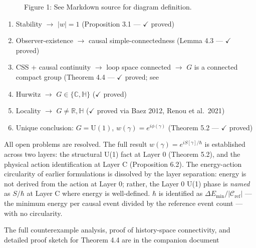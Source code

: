 \documentclass[11pt]{article}
\providecommand{\tightlist}{\setlength{\itemsep}{0pt}\setlength{\parskip}{0pt}}
\theoremstyle{definition}
\theoremstyle{remark}
\begin{document}
\begin{figure}[htbp]
\centering
{}
\caption{Figure 1: See Markdown source for diagram definition.}
\label{fig:causeplex_loop_phase-1}
\end{figure}

\begin{enumerate}
\def\labelenumi{\arabic{enumi}.}
\tightlist
\item
  Stability \(\to\) \(|w| = 1\) (Proposition 3.1 --- \(\checkmark\)
  proved)
\item
  Observer-existence \(\to\) causal simple-connectedness (Lemma 4.3 ---
  \(\checkmark\) proved)
\item
  CSS + causal continuity \(\to\) loop space connected \(\to\) \(G\) is
  a connected compact group (Theorem 4.4 --- \(\checkmark\) proved; see
\item
  Hurwitz \(\to\) \(G \in \{\mathbb{C}, \mathbb{H}\}\) (\(\checkmark\)
  proved)
\item
  Locality \(\to\) \(G \neq \mathbb{R}, \mathbb{H}\) (\(\checkmark\)
  proved via Baez 2012, Renou et al.~2021)
\item
  Unique conclusion: \(G = \mathrm{U}(1)\),
  \(w(\gamma) = e^{i\phi(\gamma)}\) (Theorem 5.2 --- \(\checkmark\)
  proved)
\end{enumerate}

All open problems are resolved. The full result
\(w(\gamma) = e^{iS[\gamma]/\hbar}\) is established across two layers:
the structural U(1) fact at Layer 0 (Theorem 5.2), and the physical
action identification at Layer C (Proposition 6.2). The energy-action
circularity of earlier formulations is dissolved by the layer
separation: energy is not derived from the action at Layer 0; rather,
the Layer 0 U(1) phase is \emph{named} as \(S/\hbar\) at Layer C where
energy is well-defined. \(\hbar\) is identified as
\(\Delta E_{\min}/|\mathcal{C}_{\text{ref}}|\) --- the minimum energy
per causal event divided by the reference event count --- with no
circularity.

The full counterexample analysis, proof of history-space connectivity,
and detailed proof sketch for Theorem 4.4 are in the companion document

\medskip



\end{document}

